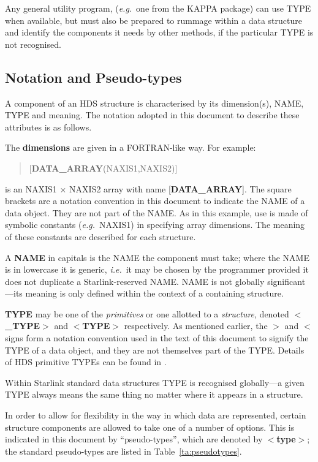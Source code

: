 Any general utility program, ({\it e.g.}\  one from the
{\small KAPPA} package) can use TYPE
when available, but must also be prepared
to rummage within a data structure
and identify the components it needs by other methods, if the particular
TYPE is not recognised.

\subsection{Notation and Pseudo-types\label{se:notation}}

A component of an HDS structure is characterised
by its dimension(s), NAME, TYPE and meaning.  The
notation adopted in this document to describe these
attributes is as follows.

The {\bf dimensions} are given in a FORTRAN-like way.
For example:
\begin{verse}
   {[}{\bf DATA\_ARRAY}(NAXIS1,NAXIS2){]}
\end{verse}
is an NAXIS1 $\times$ NAXIS2 array with name
{[}{\bf DATA\_ARRAY}{]}.
The square brackets are a notation convention
in this document to indicate the
NAME of a data object. They are not part of the NAME.
As in this example, use is made of symbolic constants ({\it e.g.}\  NAXIS1)
in specifying array dimensions.
The meaning of these constants are described for each structure.

A {\bf NAME} in capitals is the NAME the component must take; where the NAME
is in lowercase it is generic, {\it i.e.}\  it may be chosen by the
programmer provided it does not duplicate a Starlink-reserved NAME.
NAME is not globally significant---its meaning is only defined within
the context of a containing structure.

{\bf TYPE} may be one of the {\it primitives} or one
allotted to a {\it structure},
denoted $<${\bf \_TYPE}$>$ and
$<${\bf TYPE}$>$ respectively. As mentioned earlier, the $>$ and
$<$ signs form a notation convention used in the text of this
document to signify the TYPE of a data object, and they are not
themselves part of the TYPE. Details of
HDS primitive TYPEs can be found in .

Within Starlink standard data structures TYPE is
recognised globally---a given TYPE always means the same thing no 
matter where it appears in a structure.

In order to allow for
flexibility in the way in which data are represented, certain structure
components are allowed to take one of a number of options. This is
indicated in this document by ``pseudo-types'',
which are denoted by $<${\bf type}$>$;
the standard pseudo-types are listed in Table~\ref{ta:pseudotypes}.

